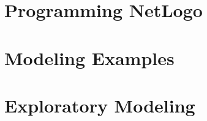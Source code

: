 
%


\part{Programming NetLogo}






\part{Modeling Examples}






\part{Exploratory Modeling} %


\appendix

\ifnum{}

\fi

\backmatter
{}
%


%






% 

% 
% 

